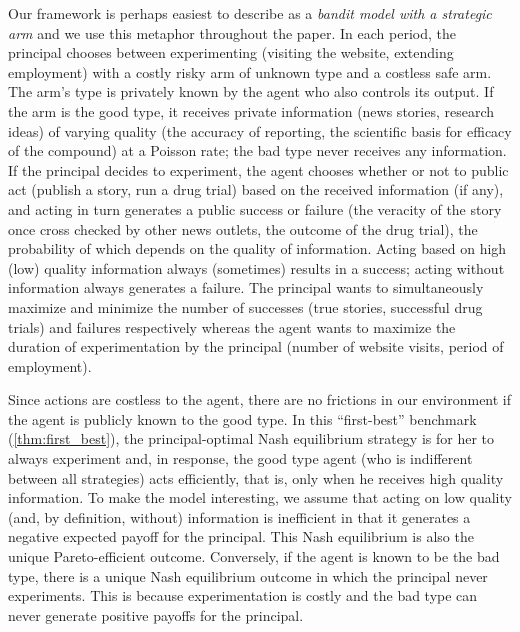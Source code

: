 \documentclass[11pt,reqno]{amsart}
\begin{document}
Our framework is perhaps easiest to describe as a \textit{bandit model with a strategic arm} and we use this metaphor throughout the paper. In each period, the principal chooses between experimenting (visiting the website, extending employment) with a costly risky arm of unknown type and a costless safe arm. The arm's type is privately known by the agent who also controls its output. If the arm is the good type, it receives private information (news stories, research ideas) of varying quality (the accuracy of reporting, the scientific basis for efficacy of the compound) at a Poisson rate; the bad type never receives any information. If the principal decides to experiment, the agent chooses whether or not to public act (publish a story, run a drug trial) based on the received information (if any), and acting in turn generates a public success or failure (the veracity of the story once cross checked by other news outlets, the outcome of the drug trial), the probability of which depends on the quality of information. Acting based on high (low) quality information always (sometimes) results in a success; acting without information always generates a failure. The principal wants to simultaneously maximize and minimize the number of successes (true stories, successful drug trials) and failures respectively whereas the agent wants to maximize the duration of experimentation by the principal (number of website visits, period of employment).

Since actions are costless to the agent, there are no frictions in our environment if the agent is publicly known to the good type. In this ``first-best'' benchmark (\cref{thm:first_best}), the principal-optimal Nash equilibrium strategy is for her to always experiment and, in response, the good type agent (who is indifferent between all strategies) acts efficiently, that is, only when he receives high quality information. To make the model interesting, we assume that acting on low quality (and, by definition, without) information is inefficient in that it generates a negative expected payoff for the principal. This Nash equilibrium is also the unique Pareto-efficient outcome. Conversely, if the agent is known to be the bad type, there is a unique Nash equilibrium outcome in which the principal never experiments. This is because experimentation is costly and the bad type can never generate positive payoffs for the principal.
\end{document}
